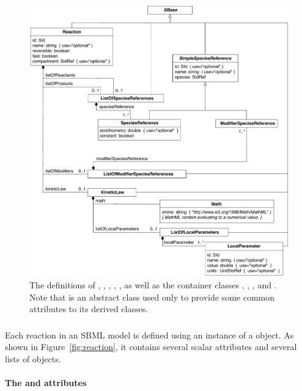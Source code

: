 \begin{figure}[htb]
  \centering
  \includegraphics[scale=0.79]{figs/reaction-uml-v2}
  \caption{The definitions of \Reaction, \KineticLaw,
    \SpeciesReference, \ModifierSpeciesReference, \LocalParameter,
    as well as the container classes \ListOfReactants,
    \ListOfProducts, \ListOfModifiers, and \ListOfLocalParameters.
    Note that \SimpleSpeciesReference is an abstract class used
    only to provide some common attributes to its derived
    classes.}
  \label{fig:reaction}
\end{figure}


\subsubsection{}
\label{sec:reaction-type}
\label{sec:listofreactants}
\label{sec:listofproducts}
\label{sec:listofmodifiers}

Each reaction in an SBML model is defined using an instance of a
\Reaction object.  As shown in Figure~\vref{fig:reaction}, it
contains several scalar attributes and several lists of objects.


\paragraph{The  and  attributes}

